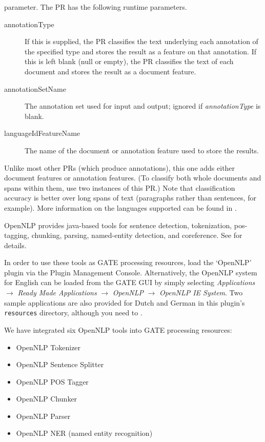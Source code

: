 parameter.  The PR has the following runtime parameters.
\begin{description}
\item[annotationType] If this is supplied, the PR classifies the text underlying
  each annotation of the specified type and stores the result as a feature on
  that annotation.  If this is left blank (null or empty), the PR classifies the
  text of each document and stores the result as a document feature.
\item[annotationSetName] The annotation set used for input and output; ignored
  if \emph{annotationType} is blank.
\item[languageIdFeatureName] The name of the document or annotation feature used
  to store the results.
\end{description}


Unlike most other PRs (which produce annotations), this one adds either document
features or annotation features.  (To classify both whole documents and spans
within them, use two instances of this PR.)  Note that classification accuracy
is better over long spans of text (paragraphs rather than sentences, for
example).  More information on the languages supported can be found in
.

OpenNLP provides java-based tools for sentence detection, tokenization,
pos-tagging, chunking, parsing, named-entity detection, and coreference. See
 for details.

In order to use these tools as GATE processing resources, load the `OpenNLP'
plugin via the Plugin Management Console. Alternatively, the OpenNLP system for
English can be loaded from the GATE GUI by simply selecting \emph{Applications}
$\rightarrow$ \emph{Ready Made Applications} $\rightarrow$ \emph{OpenNLP}
$\rightarrow$ \emph{OpenNLP IE System}.  Two sample applications are also
provided for Dutch and German in this plugin's \texttt{resources} directory,
although you need to .


We have integrated six OpenNLP tools into GATE processing resources:
\begin{itemize}
\item OpenNLP Tokenizer
\item OpenNLP Sentence Splitter
\item OpenNLP POS Tagger
\item OpenNLP Chunker
\item OpenNLP Parser
\item OpenNLP NER (named entity recognition)
\end{itemize}

